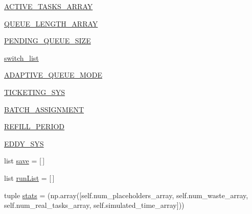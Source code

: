 \begin{DoxyCompactItemize}
\item 
\mbox{\hyperlink{classdynamicfilterapp_1_1test__simulations_1_1_simulation_test_ac077d3bb7d3ea20dab4eeb233827d36f}{A\+C\+T\+I\+V\+E\+\_\+\+T\+A\+S\+K\+S\+\_\+\+A\+R\+R\+AY}}
\item 
\mbox{\hyperlink{classdynamicfilterapp_1_1test__simulations_1_1_simulation_test_a7efdab14db5c57f9c770dc8291cc6907}{Q\+U\+E\+U\+E\+\_\+\+L\+E\+N\+G\+T\+H\+\_\+\+A\+R\+R\+AY}}
\item 
\mbox{\hyperlink{classdynamicfilterapp_1_1test__simulations_1_1_simulation_test_a5b1d5fc9201e155ca0ea4dc59352293d}{P\+E\+N\+D\+I\+N\+G\+\_\+\+Q\+U\+E\+U\+E\+\_\+\+S\+I\+ZE}}
\item 
\mbox{\hyperlink{classdynamicfilterapp_1_1test__simulations_1_1_simulation_test_adbf36f93f253ff1b441a9809a9690b06}{switch\+\_\+list}}
\item 
\mbox{\hyperlink{classdynamicfilterapp_1_1test__simulations_1_1_simulation_test_a77eb8683aad0c0d5819fb1609df4bfa9}{A\+D\+A\+P\+T\+I\+V\+E\+\_\+\+Q\+U\+E\+U\+E\+\_\+\+M\+O\+DE}}
\item 
\mbox{\hyperlink{classdynamicfilterapp_1_1test__simulations_1_1_simulation_test_a5e761f835af4412d31b27c2590f9e9f4}{T\+I\+C\+K\+E\+T\+I\+N\+G\+\_\+\+S\+YS}}
\item 
\mbox{\hyperlink{classdynamicfilterapp_1_1test__simulations_1_1_simulation_test_ac5ceb540180f8696f8c3068e1595620f}{B\+A\+T\+C\+H\+\_\+\+A\+S\+S\+I\+G\+N\+M\+E\+NT}}
\item 
\mbox{\hyperlink{classdynamicfilterapp_1_1test__simulations_1_1_simulation_test_a824eb4445d24f97d6f1a69ac75f147b3}{R\+E\+F\+I\+L\+L\+\_\+\+P\+E\+R\+I\+OD}}
\item 
\mbox{\hyperlink{classdynamicfilterapp_1_1test__simulations_1_1_simulation_test_adf56a9372b43152610f7f60cd155f3ba}{E\+D\+D\+Y\+\_\+\+S\+YS}}
\item 
list \mbox{\hyperlink{classdynamicfilterapp_1_1test__simulations_1_1_simulation_test_aa53b18c2bb4cfef68354cc568fae8e98}{save}} = \mbox{[}$\,$\mbox{]}
\item 
list \mbox{\hyperlink{classdynamicfilterapp_1_1test__simulations_1_1_simulation_test_af0a015ca9f30cd7a3f0fdade090df146}{run\+List}} = \mbox{[}$\,$\mbox{]}
\item 
tuple \mbox{\hyperlink{classdynamicfilterapp_1_1test__simulations_1_1_simulation_test_a7735d195f566a3c7a06a23cecd0d22df}{stats}} = (np.\+array(\mbox{[}self.\+num\+\_\+placeholders\+\_\+array, self.\+num\+\_\+waste\+\_\+array, self.\+num\+\_\+real\+\_\+tasks\+\_\+array, self.\+simulated\+\_\+time\+\_\+array\mbox{]}))

\end{DoxyCompactItemize}
